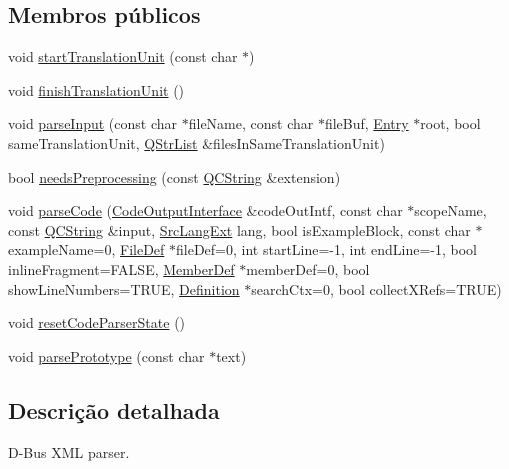 \subsection*{Membros públicos}
\begin{DoxyCompactItemize}
\item 
void \hyperlink{class_d_bus_x_m_l_scanner_a9179d0b9461d5d683468fb6015d1643f}{start\-Translation\-Unit} (const char $\ast$)
\item 
void \hyperlink{class_d_bus_x_m_l_scanner_a245c1fbfb8ba359e61d832c4e7c6c98e}{finish\-Translation\-Unit} ()
\item 
void \hyperlink{class_d_bus_x_m_l_scanner_ab1ed2c75b61719cec6060b9f69419743}{parse\-Input} (const char $\ast$file\-Name, const char $\ast$file\-Buf, \hyperlink{class_entry}{Entry} $\ast$root, bool same\-Translation\-Unit, \hyperlink{class_q_str_list}{Q\-Str\-List} \&files\-In\-Same\-Translation\-Unit)
\item 
bool \hyperlink{class_d_bus_x_m_l_scanner_ac49a959c40c82385233e4c75163e39ae}{needs\-Preprocessing} (const \hyperlink{class_q_c_string}{Q\-C\-String} \&extension)
\item 
void \hyperlink{class_d_bus_x_m_l_scanner_ac614074ea2c569cabd265a6168ad36d2}{parse\-Code} (\hyperlink{class_code_output_interface}{Code\-Output\-Interface} \&code\-Out\-Intf, const char $\ast$scope\-Name, const \hyperlink{class_q_c_string}{Q\-C\-String} \&input, \hyperlink{types_8h_a9974623ce72fc23df5d64426b9178bf2}{Src\-Lang\-Ext} lang, bool is\-Example\-Block, const char $\ast$example\-Name=0, \hyperlink{class_file_def}{File\-Def} $\ast$file\-Def=0, int start\-Line=-\/1, int end\-Line=-\/1, bool inline\-Fragment=F\-A\-L\-S\-E, \hyperlink{class_member_def}{Member\-Def} $\ast$member\-Def=0, bool show\-Line\-Numbers=T\-R\-U\-E, \hyperlink{class_definition}{Definition} $\ast$search\-Ctx=0, bool collect\-X\-Refs=T\-R\-U\-E)
\item 
void \hyperlink{class_d_bus_x_m_l_scanner_a5d8e0ded4118b6eff98aa23eb64db02c}{reset\-Code\-Parser\-State} ()
\item 
void \hyperlink{class_d_bus_x_m_l_scanner_a022344e4fa95056a941a9e8c02334872}{parse\-Prototype} (const char $\ast$text)
\end{DoxyCompactItemize}


\subsection{Descrição detalhada}
D-\/\-Bus X\-M\-L parser.

